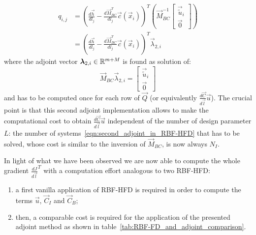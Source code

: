 \begin{equation}
	\begin{aligned}
		q_{i,j} & =
		\left( \frac{d \vec{h}}{d l_j} - \frac{d \vec{M}_{BC}^T}{d l_j} \vec{c}(\vec{x}_i) \right)^T
		\left(
		\vec{M}_{BC}^{-1}
		\begin{bmatrix}
			\vec{\tilde{u}}_i  \\
			\vec{0}
		\end{bmatrix}
		\right)  \\
				& =
		\left( \frac{d \vec{h}}{d l_j} - \frac{d \vec{M}_{BC}^T}{d l_j} \vec{c}(\vec{x}_i) \right)^T
		\vec{\lambda}_{2,i}
	\end{aligned}
\end{equation}
where the adjoint vector $\boldsymbol{\lambda}_{2,i} \in \mathbb{R}^{m+M}$ is found as solution of:
\begin{equation}
	\label{eqn:second_adjoint_in_RBF-HFD}
	\vec{M}_{BC} \vec{\lambda}_{2,i} =
	\begin{bmatrix}
		\vec{\tilde{u}}_i  \\
		\vec{0}
	\end{bmatrix}
\end{equation}
and has to be computed once for each row of $\vec{Q}$ (or equivalently $\frac{d\vec{C}}{d\vec{l}} \vec{u}$). The crucial point is that this second adjoint implementation allows to make the computational cost to obtain $\frac{d\vec{C}}{d\vec{l}} \vec{u}$ independent of the number of design parameter $L$: the number of systems~\eqref{eqn:second_adjoint_in_RBF-HFD} that has to be solved, whose cost is similar to the inversion of $\vec{M}_{BC}$, is now always $N_I$.

\smallskip
In light of what we have been observed we are now able to compute the whole gradient $\frac{dJ}{d\vec{l}}^T$ with a computation effort analogous to two RBF-HFD:
\begin{enumerate}
	\item a first vanilla application of RBF-HFD is required in order to compute the terms $\vec{u}$, $\vec{C}_I$ and $\vec{C}_B$;
	\item then, a comparable cost is required for the application of the presented adjoint method as shown in table~\ref{tab:RBF-FD_and_adjoint_comparison}.
\end{enumerate}

